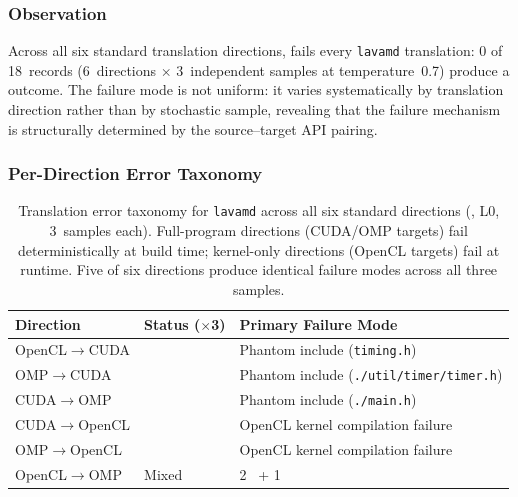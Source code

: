 \subsubsection*{Observation}

Across all six standard translation directions, \qwenshort{} fails every \texttt{lavamd} translation: 0 of 18~records (6~directions $\times$ 3~independent samples at temperature~0.7) produce a \pass{} outcome. The failure mode is not uniform: it varies systematically by translation direction rather than by stochastic sample, revealing that the failure mechanism is structurally determined by the source--target API pairing.

\subsubsection*{Per-Direction Error Taxonomy}

\begin{table}[htbp]
  \centering
  \caption{Translation error taxonomy for \texttt{lavamd} across all
  six standard directions (\qwenshort{}, L0, 3~samples each). Full-program
  directions (CUDA/OMP targets) fail deterministically at build time;
  kernel-only directions (OpenCL targets) fail at runtime. Five of six
  directions produce identical failure modes across all three samples.}
  \label{tab:lavamd-errors}
  \small
  \begin{tabular}{@{}llp{4.5cm}@{}}
    \toprule
    Direction & Status ($\times$3) & Primary Failure Mode \\
    \midrule
    OpenCL$\to$CUDA & \buildfail{} & Phantom include (\texttt{timing.h}) \\
    OMP$\to$CUDA    & \buildfail{} & Phantom include (\texttt{./util/timer/timer.h}) \\
    CUDA$\to$OMP    & \buildfail{} & Phantom include (\texttt{./main.h}) \\
    CUDA$\to$OpenCL & \runfail{}   & OpenCL kernel compilation failure \\
    OMP$\to$OpenCL  & \runfail{}   & OpenCL kernel compilation failure \\
    OpenCL$\to$OMP  & Mixed        & 2~\buildfail{} + 1~\verifyfail{} \\
    \bottomrule
  \end{tabular}
\end{table}

